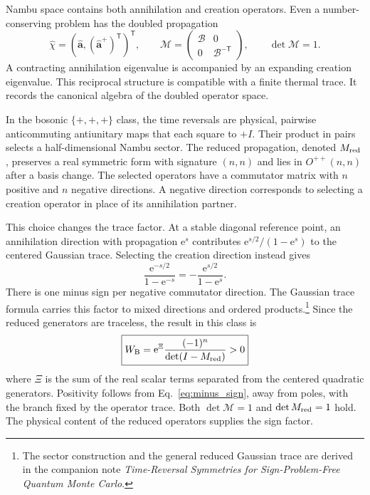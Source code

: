 \documentclass[11pt,a4paper]{article}
\newcommand{\ee}{\mathrm{e}}
\newcommand{\trans}{\mathsf{T}}
\newcommand{\mc}[1]{\mathcal{#1}}
\newcommand{\bb}[1]{\bm{#1}}
\begin{document}
Nambu space contains both annihilation and creation operators. Even a
number-conserving problem has the doubled propagation
\begin{equation}
    \hat\chi=(\hat{\bb a},(\hat{\bb a}^{+})^\trans)^\trans,
    \qquad
    \mc M=
    \begin{pmatrix}\mc B&0\\0&\mc B^{-\trans}\end{pmatrix},
    \qquad
    \det\mc M=1.
    \label{eq:nambu_product}
\end{equation}
A contracting annihilation eigenvalue is accompanied by an expanding
creation eigenvalue. This reciprocal structure is compatible with a
finite thermal trace. It records the canonical algebra of the doubled
operator space.

In the bosonic $\{+,+,+\}$ class, the time reversals are physical,
pairwise anticommuting antiunitary maps that each square to $+I$.
Their product in pairs selects a half-dimensional Nambu sector.
The reduced propagation, denoted $M_{\rm red}$, preserves a real symmetric
form with signature $(n,n)$ and lies in $O^{++}(n,n)$ after a basis change.
The selected operators have a commutator matrix with $n$ positive and
$n$ negative directions. A negative direction corresponds to selecting
a creation operator in place of its annihilation partner.

This choice changes the trace factor. At a stable diagonal reference point,
an annihilation direction with propagation $\ee^s$ contributes
$\ee^{s/2}/(1-\ee^s)$ to the centered Gaussian trace. Selecting the creation
direction instead gives
\begin{equation}
    \frac{\ee^{-s/2}}{1-\ee^{-s}}
    =-\frac{\ee^{s/2}}{1-\ee^s}.
    \label{eq:reversed_direction}
\end{equation}
There is one minus sign per negative commutator direction. The Gaussian
trace formula carries this factor to mixed directions and ordered
products.\footnote{The sector construction and the general reduced
Gaussian trace are derived in the companion note
\emph{Time-Reversal Symmetries for Sign-Problem-Free Quantum Monte Carlo}.}
Since the reduced generators are traceless, the result in this class is
\begin{equation}
    \boxed{
    W_{\rm B}=\ee^\Xi
       \frac{(-1)^n}{\det(I-M_{\rm red})}>0
    }
    \label{eq:reduced_weight}
\end{equation}
where $\Xi$ is the sum of the real scalar terms separated from the
centered quadratic generators. Positivity follows from
Eq.~\eqref{eq:minus_sign}, away from poles, with the branch fixed by
the operator trace. Both $\det\mc M=1$ and $\det M_{\rm red}=1$ hold.
The physical content of the reduced operators supplies the sign factor.
\end{document}
